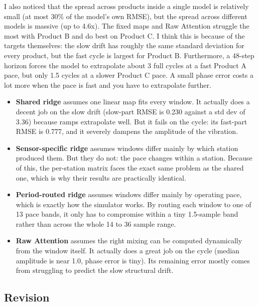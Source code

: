 \documentclass[11pt,letterpaper]{article}
\begin{document}
I also noticed that the spread across products inside a single model is relatively small (at most 30\% of the model's own RMSE), but the spread across different models is massive (up to 4.6x). The fixed maps and Raw Attention struggle the most with Product B and do best on Product C. I think this is because of the targets themselves: the slow drift has roughly the same standard deviation for every product, but the fast cycle is largest for Product B. Furthermore, a 48-step horizon forces the model to extrapolate about 3 full cycles at a fast Product A pace, but only 1.5 cycles at a slower Product C pace. A small phase error costs a lot more when the pace is fast and you have to extrapolate further.

\begin{itemize}
\item \textbf{Shared ridge} assumes one linear map fits every window. It actually does a decent job on the slow drift (slow-part RMSE is 0.230 against a std dev of 3.36) because ramps extrapolate well. But it fails on the cycle: its fast-part RMSE is 0.777, and it severely dampens the amplitude of the vibration.
\item \textbf{Sensor-specific ridge} assumes windows differ mainly by which station produced them. But they do not: the pace changes {within} a station. Because of this, the per-station matrix faces the exact same problem as the shared one, which is why their results are practically identical. 
\item \textbf{Period-routed ridge} assumes windows differ mainly by operating pace, which is exactly how the simulator works. By routing each window to one of 13 pace bands, it only has to compromise within a tiny 1.5-sample band rather than across the whole 14 to 36 sample range.
\item \textbf{Raw Attention} assumes the right mixing can be computed dynamically from the window itself. It actually does a great job on the cycle (median amplitude is near 1.0, phase error is tiny). Its remaining error mostly comes from struggling to predict the slow structural drift.
\end{itemize}

\subsection*{Revision}
\end{document}
